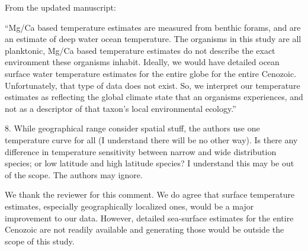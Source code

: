 \documentclass[12pt,letterpaper]{article}
\begin{document}
\begin{refsection}
From the updated manuscript:

``Mg/Ca based temperature estimates are measured from benthic forams, and are an estimate of deep water ocean temperature. The organisms in this study are all planktonic, Mg/Ca based temperature estimates do not describe the exact environment these organisms inhabit. Ideally, we would have detailed ocean surface water temperature estimates for the entire globe for the entire Cenozoic. Unfortunately, that type of data does not exist. So, we interpret our temperature estimates as reflecting the global climate state that an organisms experiences, and not as a descriptor of that taxon's local environmental ecology.''


\begin{bfseries}
  8. While geographical range consider spatial stuff, the authors use one temperature curve for all (I understand there will be no other way). Is there any difference in temperature sensitivity between narrow and wide distribution species; or low latitude and high latitude species? I understand this may be out of the scope. The authors may ignore.
\end{bfseries}

We thank the reviewer for this comment. We do agree that surface temperature estimates, especially geographically localized ones, would be a major improvement to our data. However, detailed sea-surface estimates for the entire Cenozoic are not readily available and generating those would be outside the scope of this study.







\printbibliography
\end{refsection}
\end{document}
